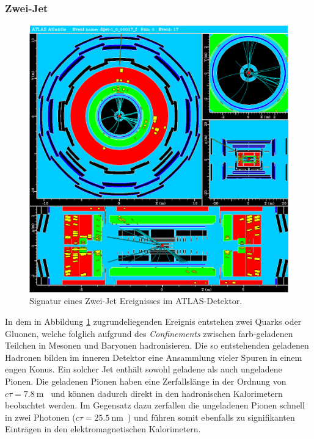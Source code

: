 \documentclass[11pt, a4paper]{article}
\numberwithin{equation}{section}
\begin{document}
\clearpage
\subsubsection{Zwei-Jet}
\begin{figure}[htbp]
	\centering
	\includegraphics[width=1.0\textwidth]{./data/atlantis/singlepart_events_new/jets/muon.png}
	\caption{Signatur eines Zwei-Jet Ereignisses im ATLAS-Detektor.}
	\label{fig:jets-muon}
\end{figure}
\vfill
\noindent
In dem in Abbildung \ref{fig:jets-muon} zugrundeliegenden Ereignis entstehen zwei Quarks oder Gluonen, welche folglich aufgrund des \textit{Confinements} zwischen farb-geladenen Teilchen in Mesonen und Baryonen hadronisieren.
Die so entstehenden geladenen Hadronen bilden im inneren Detektor eine Ansammlung vieler Spuren in einem engen Konus.
Ein solcher Jet enthält sowohl geladene als auch ungeladene Pionen.
Die geladenen Pionen haben eine Zerfallslänge in der Ordnung von $c \tau = \SI{7.8}{\meter}$~\cite{pdg} und können dadurch direkt in den hadronischen Kalorimetern beobachtet werden.
Im Gegensatz dazu zerfallen die ungeladenen Pionen schnell in zwei Photonen ($c \tau = \SI{25.5}{\nano\meter}$~\cite{pdg}) und führen somit ebenfalls zu signifikanten Einträgen in den elektromagnetischen Kalorimetern.
\end{document}
